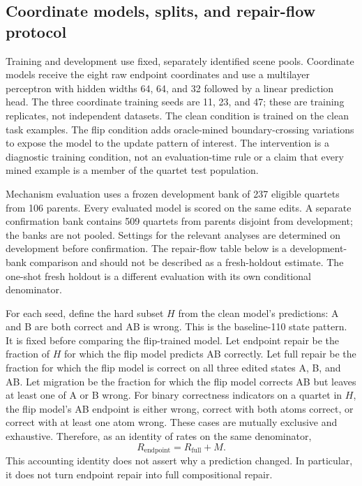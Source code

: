\hypertarget{coordinate-models-splits-and-repair-flow-protocol}{%
\subsection{Coordinate models, splits, and repair-flow protocol}\label{coordinate-models-splits-and-repair-flow-protocol}}

Training and development use fixed, separately identified scene pools. Coordinate models receive the eight raw endpoint coordinates and use a multilayer perceptron with hidden widths 64, 64, and 32 followed by a linear prediction head. The three coordinate training seeds are 11, 23, and 47; these are training replicates, not independent datasets. The clean condition is trained on the clean task examples. The flip condition adds oracle-mined boundary-crossing variations to expose the model to the update pattern of interest. The intervention is a diagnostic training condition, not an evaluation-time rule or a claim that every mined example is a member of the quartet test population.

Mechanism evaluation uses a frozen development bank of 237 eligible quartets from 106 parents. Every evaluated model is scored on the same edits. A separate confirmation bank contains 509 quartets from parents disjoint from development; the banks are not pooled. Settings for the relevant analyses are determined on development before confirmation. The repair-flow table below is a development-bank comparison and should not be described as a fresh-holdout estimate. The one-shot fresh holdout is a different evaluation with its own conditional denominator.

For each seed, define the hard subset \(H\) from the clean model's predictions: A and B are both correct and AB is wrong. This is the baseline-110 state pattern. It is fixed before comparing the flip-trained model. Let endpoint repair be the fraction of \(H\) for which the flip model predicts AB correctly. Let full repair be the fraction for which the flip model is correct on all three edited states A, B, and AB. Let migration be the fraction for which the flip model corrects AB but leaves at least one of A or B wrong. For binary correctness indicators on a quartet in \(H\), the flip model's AB endpoint is either wrong, correct with both atoms correct, or correct with at least one atom wrong. These cases are mutually exclusive and exhaustive. Therefore, as an identity of rates on the same denominator, \[
R_{\mathrm{endpoint}}=R_{\mathrm{full}}+M.
\] This accounting identity does not assert why a prediction changed. In particular, it does not turn endpoint repair into full compositional repair.

